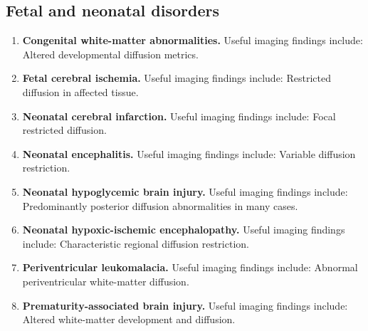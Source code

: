 \subsection{Fetal and neonatal disorders}
\begin{enumerate}[leftmargin=*,itemsep=0.45em,topsep=0.4em]
\item \textbf{Congenital white-matter abnormalities.} Useful imaging findings include: Altered developmental diffusion metrics.
\item \textbf{Fetal cerebral ischemia.} Useful imaging findings include: Restricted diffusion in affected tissue.
\item \textbf{Neonatal cerebral infarction.} Useful imaging findings include: Focal restricted diffusion.
\item \textbf{Neonatal encephalitis.} Useful imaging findings include: Variable diffusion restriction.
\item \textbf{Neonatal hypoglycemic brain injury.} Useful imaging findings include: Predominantly posterior diffusion abnormalities in many cases.
\item \textbf{Neonatal hypoxic-ischemic encephalopathy.} Useful imaging findings include: Characteristic regional diffusion restriction.
\item \textbf{Periventricular leukomalacia.} Useful imaging findings include: Abnormal periventricular white-matter diffusion.
\item \textbf{Prematurity-associated brain injury.} Useful imaging findings include: Altered white-matter development and diffusion.
\end{enumerate}

